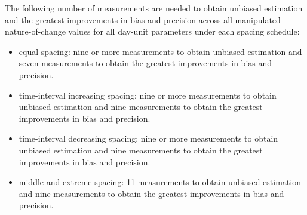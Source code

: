 \documentclass[
12pt, %
twoside,
english]{guelphthesis}
\begin{document}
The following number of measurements are needed to obtain unbiased estimation and the greatest improvements in bias and precision across all manipulated nature-of-change values for all day-unit parameters under each spacing schedule:
\begin{itemize}
\tightlist
\item
  equal spacing: nine or more measurements to obtain unbiased estimation and seven measurements to obtain the greatest improvements in bias and precision.
\item
  time-interval increasing spacing: nine or more measurements to obtain unbiased estimation and nine measurements to obtain the greatest improvements in bias and precision.
\item
  time-interval decreasing spacing: nine or more measurements to obtain unbiased estimation and nine measurements to obtain the greatest improvements in bias and precision.
\item
  middle-and-extreme spacing: 11 measurements to obtain unbiased estimation and nine measurements to obtain the greatest improvements in bias and precision.
\end{itemize}
\end{document}
